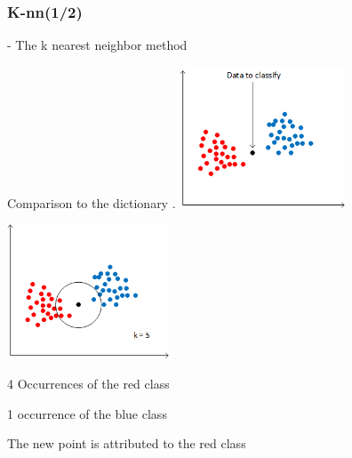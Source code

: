 \documentclass[xcolor=table]{beamer}
\begin{document}
\begin{frame}\frametitle{K-nn(1/2)}


- The k nearest neighbor method

\begin{itemize}
\item<1-> Comparison to the dictionary .
 {\includegraphics[height=4.2cm]{knnwc.png}} %
 {\includegraphics[height=4cm]{knnac.png}
\item 4 Occurrences of {the \color{red} red} class
\item 1 occurrence of {the \color{blue} blue} class
\item The new point is attributed to {the \color{red} red} class}
\end{itemize}

\end{frame}
\end{document}
